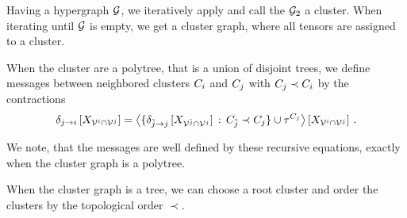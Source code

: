
Having a hypergraph $\mathcal{G}$, we iteratively apply  and call the $\mathcal{G}_2$ a cluster.
When iterating until $\mathcal{G}$ is empty, we get a cluster graph, where all tensors are assigned to a cluster.

When the cluster are a polytree, that is a union of disjoint trees, we define messages between neighbored clusters $C_{i}$ and $C_{j}$ with $C_{j}\prec C_{i}$ by the contractions
\begin{align*}
	\delta_{j \rightarrow i}\left[X_{\mathcal{V}^{i}\cap\mathcal{V}^{j}}\right]
	= \left\langle \{
	\delta_{\tilde{j} \rightarrow j}\left[X_{\mathcal{V}^{\tilde{j}}\cap\mathcal{V}^{j}}\right]
	\, : \, C_{\tilde{j}}\prec C_{j}\} \cup \tau^{C_{j}}\right\rangle \left[ X_{\mathcal{V}^{i}\cap\mathcal{V}^{j}} \right] \, .
\end{align*}



We note, that the messages are well defined by these recursive equations, exactly when the cluster graph is a polytree.

When the cluster graph is a tree, we can choose a root cluster and order the clusters by the topological order $\prec$.


